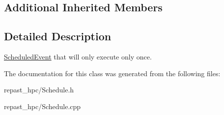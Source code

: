 \subsection*{Additional Inherited Members}


\subsection{Detailed Description}
\hyperlink{classrepast_1_1_scheduled_event}{Scheduled\-Event} that will only execute only once. 

The documentation for this class was generated from the following files\-:\begin{DoxyCompactItemize}
\item 
repast\-\_\-hpc/Schedule.\-h\item 
repast\-\_\-hpc/Schedule.\-cpp\end{DoxyCompactItemize}
